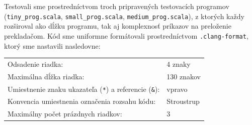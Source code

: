 {\vspace{0.75em}
\noindent Testovali sme prostredníctvom troch pripravených testovacích programov (\verb|tiny_prog.scala|, \verb|small_prog.scala|, \verb|medium_prog.scala|), z ktorých každy rozširoval ako dĺžku programu, tak aj komplexnosť príkazov na preloženie prekladačom.
\newpage
\vspace{0.75em}
\noindent Kód sme uniformne formátovali prostredníctvom \verb|.clang-format|, ktorý sme nastavili nasledovne:\\

\vspace{0.75em}
\noindent
\begin{tabular}{l l}
  Odsadenie riadka: & 4 znaky\\
  Maximálna dĺžka riadka: & 130 znakov\\
  Umiestnenie znaku ukazateľa (\verb|*|) a referencie (\verb|&|): & vpravo \\
  Konvencia umiestnenia označenia rozsahu kódu: & Stroustrup \\
  Maximálny počet prázdnych riadkov: & 3
\end{tabular}
\hspace*{0.25cm}
}